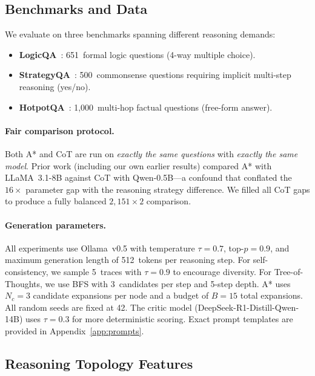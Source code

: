 \documentclass{article}
\begin{document}
\subsection{Benchmarks and Data}
\label{sec:data}

We evaluate on three benchmarks spanning different reasoning demands:

\begin{itemize}[leftmargin=1.5em,itemsep=2pt]
\item \textbf{LogicQA}~\citep{liu2020logiqa}: 651~formal logic questions
(4-way multiple choice).
\item \textbf{StrategyQA}~\citep{geva2021did}: 500~commonsense questions
requiring implicit multi-step reasoning (yes/no).
\item \textbf{HotpotQA}~\citep{yang2018hotpotqa}: 1,000~multi-hop factual
questions (free-form answer).
\end{itemize}

\paragraph{Fair comparison protocol.}
Both A* and CoT are run on \emph{exactly the same questions} with
\emph{exactly the same model}.  Prior work (including our own earlier results)
compared A* with LLaMA~3.1-8B against CoT with Qwen-0.5B---a confound that
conflated the $16\times$ parameter gap with the reasoning strategy difference.
We filled all CoT gaps to produce a fully balanced $2{,}151 \times 2$
comparison.

\paragraph{Generation parameters.}
All experiments use Ollama~v0.5 with temperature $\tau = 0.7$, top-$p = 0.9$,
and maximum generation length of 512~tokens per reasoning step.  For
self-consistency, we sample 5~traces with $\tau = 0.9$ to encourage diversity.
For Tree-of-Thoughts, we use BFS with 3~candidates per step and 5-step depth.
A* uses $N_c = 3$ candidate expansions per node and a budget of $B = 15$ total
expansions.  All random seeds are fixed at 42.  The critic model
(DeepSeek-R1-Distill-Qwen-14B) uses $\tau = 0.3$ for more deterministic
scoring.  Exact prompt templates are provided in Appendix~\ref{app:prompts}.

\subsection{Reasoning Topology Features}
\label{sec:features}
\end{document}
